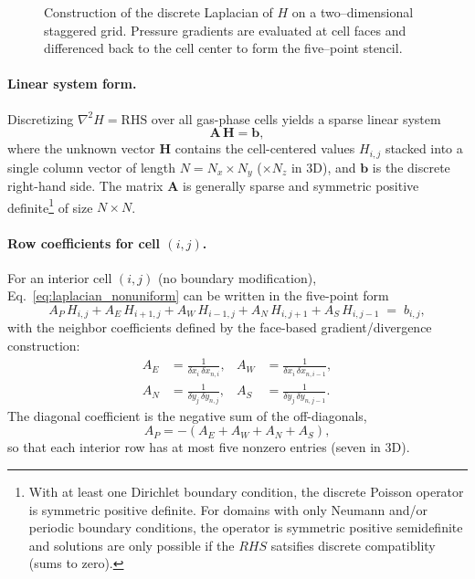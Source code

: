 \begin{figure}[h]
\caption[The discrete Laplacian on a two–dimensional staggered grid]{Construction of the discrete Laplacian of $H$ on a two–dimensional staggered grid. Pressure gradients are evaluated at cell faces and differenced back to the cell center to form the five–point stencil.}
\label{fig:laplacian_staggered}
\end{figure}


\paragraph{Linear system form.}
Discretizing $\nabla^2 H = \mathrm{RHS}$ over all gas-phase cells yields a sparse linear system
\begin{equation}
\mathbf{A}\,\mathbf{H} = \mathbf{b},
\label{eq:AHb}
\end{equation}
where the unknown vector $\mathbf{H}$ contains the cell-centered values $H_{i,j}$ stacked into a single column vector of length $N=N_x \times N_y$ ($\times N_z$ in 3D), and $\mathbf{b}$ is the discrete right-hand side.  The matrix $\mathbf{A}$ is generally sparse and symmetric positive definite\footnote{With at least one Dirichlet boundary condition, the discrete Poisson operator is symmetric positive definite. For domains with only Neumann and/or periodic boundary conditions, the operator is symmetric positive semidefinite and solutions are only possible if the $RHS$ satsifies discrete compatiblity (sums to zero).} of size $N \times N$.

\paragraph{Row coefficients for cell $(i,j)$.}
For an interior cell $(i,j)$ (no boundary modification), Eq.~\eqref{eq:laplacian_nonuniform} can be written in the five-point form
\begin{equation}
A_{P}\,H_{i,j} + A_{E}\,H_{i+1,j} + A_{W}\,H_{i-1,j} + A_{N}\,H_{i,j+1} + A_{S}\,H_{i,j-1} \;=\; b_{i,j},
\label{eq:row_stencil}
\end{equation}
with the neighbor coefficients defined by the face-based gradient/divergence construction:
\begin{align}
A_{E} &= \frac{1}{\delta x_i\,\delta x_{n,i}}, &
A_{W} &= \frac{1}{\delta x_i\,\delta x_{n,i-1}}, \label{eq:AE_AW}\\[4pt]
A_{N} &= \frac{1}{\delta y_j\,\delta y_{n,j}}, &
A_{S} &= \frac{1}{\delta y_j\,\delta y_{n,j-1}}. \label{eq:AN_AS}
\end{align}
The diagonal coefficient is the negative sum of the off-diagonals,
\begin{equation}
A_{P} = -\left(A_{E}+A_{W}+A_{N}+A_{S}\right),
\label{eq:AP}
\end{equation}
so that each interior row has at most five nonzero entries (seven in 3D).

